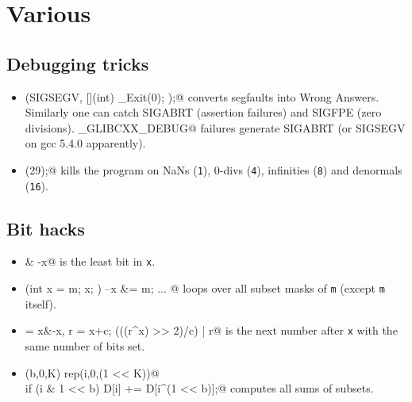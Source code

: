 \chapter{Various}




\section{Debugging tricks}
	\begin{itemize}
		\item \verb@signal(SIGSEGV, [](int) { _Exit(0); });@ converts segfaults into Wrong Answers.
			Similarly one can catch SIGABRT (assertion failures) and SIGFPE (zero divisions).
			\verb@_GLIBCXX_DEBUG@ failures generate SIGABRT (or SIGSEGV on gcc 5.4.0 apparently).
		\item \verb@feenableexcept(29);@ kills the program on NaNs (\texttt 1), 0-divs (\texttt 4), infinities (\texttt 8) and denormals (\texttt{16}).
	\end{itemize}

\section{Bit hacks}
	\begin{itemize}
		\item \verb@x & -x@ is the least bit in \texttt{x}.
		\item \verb@for (int x = m; x; ) { --x &= m; ... }@ loops over all subset masks of \texttt{m} (except \texttt{m} itself).
		\item \verb@c = x&-x, r = x+c; (((r^x) >> 2)/c) | r@ is the next number after \texttt{x} with the same number of bits set.
		\item \verb@rep(b,0,K) rep(i,0,(1 << K))@ \\ \verb@  if (i & 1 << b) D[i] += D[i^(1 << b)];@ computes all sums of subsets.
	\end{itemize}